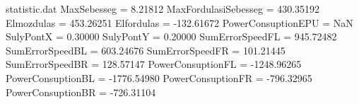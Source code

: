 \begin{filecontents*}{statistic.dat}
MaxSebesseg =    8.21812
MaxFordulasiSebesseg =  430.35192
Elmozdulas =  453.26251
Elfordulas = -132.61672
PowerConsuptionEPU =        NaN
SulyPontX =    0.30000
SulyPontY =    0.20000
SumErrorSpeedFL =  945.72482
SumErrorSpeedBL =  603.24676
SumErrorSpeedFR =  101.21445
SumErrorSpeedBR =  128.57147
PowerConsuptionFL = -1248.96265
PowerConsuptionBL = -1776.54980
PowerConsuptionFR = -796.32965
PowerConsuptionBR = -726.31104
\end{filecontents*}
